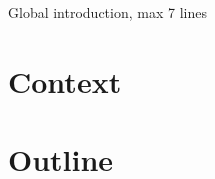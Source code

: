 Global introduction, max 7 lines

\section{Context}\label{sec:Intro:Context}




\section{Outline}\label{sec:Intro:Outline}